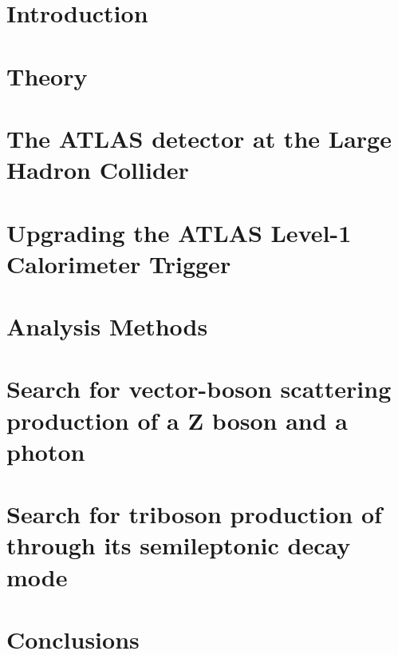 \newcommand\relpath[1]{#1}
\newcommand\inputchapter[1]{}
\newcommand\resource[1]{#1}
\chapter*{Introduction}
\inputchapter{introduction}

\chapter{Theory}
\label{sec:theory}
\inputchapter{theory}

\chapter{The ATLAS detector at the Large Hadron Collider}
\label{sec:detector}
\inputchapter{detector}

\chapter{Upgrading the ATLAS Level-1 Calorimeter Trigger}
\label{sec:trig}
\inputchapter{l1calo}

\chapter{Analysis Methods}
\label{sec:methods}
\inputchapter{analysis-common}

\chapter{Search for vector-boson scattering production of a Z boson and a photon}
\label{sec:vbs}
\inputchapter{vbs}

\chapter{Search for triboson production of \VZy through its semileptonic decay mode}
\label{sec:vzy}
\inputchapter{vzy}

\chapter*{Conclusions}
\inputchapter{conclusion}
